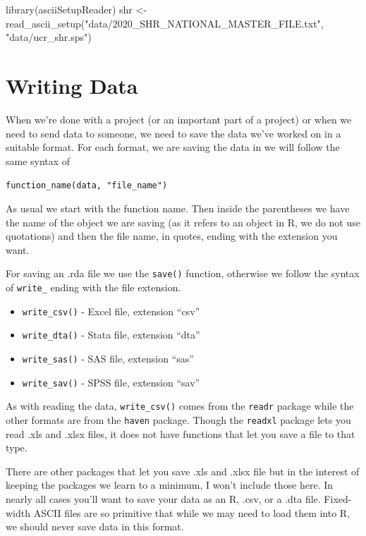 \documentclass[
]{krantz}
\makeatletter
\newenvironment{Shaded}{\begin{snugshade}}{\end{snugshade}}
\newcommand{\FunctionTok}[1]{\textcolor[rgb]{0,0,0}{#1}}
\newcommand{\NormalTok}[1]{#1}
\newcommand{\OtherTok}[1]{\textcolor[rgb]{0.37,0.37,0.37}{#1}}
\newcommand{\StringTok}[1]{\textcolor[rgb]{0.5,0.5,0.5}{#1}}
\providecommand{\tightlist}{%
  \setlength{\itemsep}{0pt}\setlength{\parskip}{0pt}}
\newenvironment{kframe}{%
\medskip{}
\setlength{\fboxsep}{.8em}
 \def\at@end@of@kframe{}%
 \ifinner\ifhmode%
  \def\at@end@of@kframe{\end{minipage}}%
  \begin{minipage}{\columnwidth}%
 \fi\fi%
 \def\FrameCommand##1{\hskip\@totalleftmargin \hskip-\fboxsep
 \colorbox{shadecolor}{##1}\hskip-\fboxsep
     \hskip-\linewidth \hskip-\@totalleftmargin \hskip\columnwidth}%
 \MakeFramed {\advance\hsize-\width
   \@totalleftmargin\z@ \linewidth\hsize
   \@setminipage}}%
 {\par\unskip\endMakeFramed%
 \at@end@of@kframe}
\renewenvironment{Shaded}{\begin{kframe}}{\end{kframe}}
\makeatother
\begin{document}
\begin{Shaded}
\begin{Highlighting}[]
\FunctionTok{library}\NormalTok{(asciiSetupReader)}
\NormalTok{shr }\OtherTok{\textless{}{-}} \FunctionTok{read\_ascii\_setup}\NormalTok{(}\StringTok{"data/2020\_SHR\_NATIONAL\_MASTER\_FILE.txt"}\NormalTok{, }\StringTok{"data/ucr\_shr.sps"}\NormalTok{)}
\end{Highlighting}
\end{Shaded}

\hypertarget{writing-data}{%
\section{Writing Data}\label{writing-data}}

When we're done with a project (or an important part of a project) or when we need to send data to someone, we need to save the data we've worked on in a suitable format. For each format, we are saving the data in we will follow the same syntax of

\texttt{function\_name(data,\ "file\_name")}

As usual we start with the function name. Then inside the parentheses we have the name of the object we are saving (as it refers to an object in R, we do not use quotations) and then the file name, in quotes, ending with the extension you want.

For saving an .rda file we use the \texttt{save()} function, otherwise we follow the syntax of \texttt{write\_} ending with the file extension.

\begin{itemize}
\tightlist
\item
  \texttt{write\_csv()} - Excel file, extension ``csv''
\item
  \texttt{write\_dta()} - Stata file, extension ``dta''
\item
  \texttt{write\_sas()} - SAS file, extension ``sas''
\item
  \texttt{write\_sav()} - SPSS file, extension ``sav''
\end{itemize}

As with reading the data, \texttt{write\_csv()} comes from the \texttt{readr} package while the other formats are from the \texttt{haven} package. Though the \texttt{readxl} package lets you read .xls and .xlsx files, it does not have functions that let you save a file to that type.

There are other packages that let you save .xls and .xlsx file but in the interest of keeping the packages we learn to a minimum, I won't include those here. In nearly all cases you'll want to save your data as an R, .csv, or a .dta file. Fixed-width ASCII files are so primitive that while we may need to load them into R, we should never save data in this format.
\end{document}
